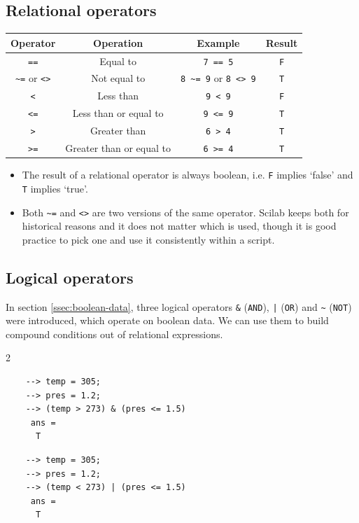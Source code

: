 	\subsection{Relational operators}
		\begin{table}[h!]
			\centering
			\begin{tabular}{cccc}
				\toprule[1.5pt]
				{\textbf{Operator}} & {\textbf{Operation}} & {\textbf{Example}} & {\textbf{Result}} \\
				\midrule[1.2pt]
				{\verb|==|} & {Equal to} & {\verb|7 == 5|} & {\verb|F|} \\ \hline
				{\verb|~=| or \verb|<>|} & {Not equal to} & {\verb|8 ~= 9| or \verb|8 <> 9|} & {\verb|T|} \\ \hline
				{\verb|<|} & {Less than} & {\verb|9 < 9|} & {\verb|F|} \\ \hline
				{\verb|<=|} & {Less than or equal to} & {\verb|9 <= 9|} & {\verb|T|} \\ \hline
				{\verb|>|} & {Greater than} & {\verb|6 > 4|} & {\verb|T|} \\ \hline
				{\verb|>=|} & {Greater than or equal to} & {\verb|6 >= 4|} & {\verb|T|} \\
				\bottomrule[1.5pt]
			\end{tabular}
		\end{table}
		
		\begin{itemize}
			\item The result of a relational operator is always boolean, i.e. \verb|F| implies `false' and \verb|T| implies `true'.
			
			\item Both \verb|~=| and \verb|<>| are two versions of the same operator. Scilab keeps both for historical reasons and it does not matter which is used, though it is good practice to pick one and use it consistently within a script.
		\end{itemize}
	
	\subsection{Logical operators}
		In section \ref{ssec:boolean-data}, three logical operators \verb|&| (\texttt{AND}), \texttt{|} (\texttt{OR}) and \verb|~| (\texttt{NOT}) were introduced, which operate on boolean data. We can use them to build compound conditions out of relational expressions.
		\begin{multicols}{2}
			\begin{verbatim}
	--> temp = 305;
	--> pres = 1.2;
	--> (temp > 273) & (pres <= 1.5)	
	 ans =
	  T
			\end{verbatim}
			
			\begin{verbatim}
	--> temp = 305;
	--> pres = 1.2;
	--> (temp < 273) | (pres <= 1.5)
	 ans =
	  T
			\end{verbatim}
		\end{multicols}
		
